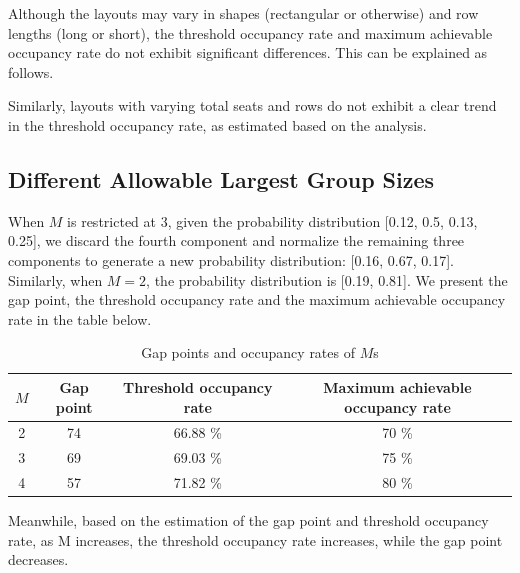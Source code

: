 Although the layouts may vary in shapes (rectangular or otherwise) and row lengths (long or short), the threshold occupancy rate and maximum achievable occupancy rate do not exhibit significant differences. This can be explained as follows.

Similarly, layouts with varying total seats and rows do not exhibit a clear trend in the threshold occupancy rate, as estimated based on the analysis.


\subsection*{Different Allowable Largest Group Sizes}
When $M$ is restricted at 3, given the probability distribution [0.12, 0.5, 0.13, 0.25], we discard the fourth component and normalize the remaining three components to generate a new probability distribution: [0.16, 0.67, 0.17]. Similarly, when $M =2$, the probability distribution is [0.19, 0.81].
We present the gap point, the threshold occupancy rate and the maximum achievable occupancy rate in the table below.

\begin{table}[ht]
  \centering
  \caption{Gap points and occupancy rates of $M$s}
  \begin{tabular}{c|ccc}
  \hline
   $M$  & Gap point & Threshold occupancy rate & Maximum achievable occupancy rate \\
  \hline
   2 &  74  & 66.88 \% & 70 \% \\
   3 &  69  & 69.03 \% & 75 \% \\
   4 &  57  & 71.82 \% & 80 \% \\
   \hline
  \end{tabular}
\end{table}

Meanwhile, based on the estimation of the gap point and threshold occupancy rate, as M increases, the threshold occupancy rate increases, while the gap point decreases.



